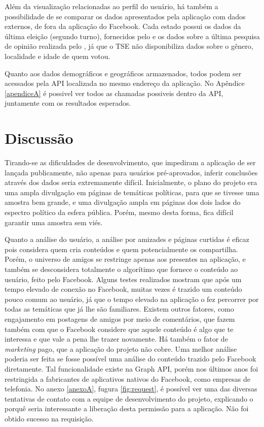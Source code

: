 \documentclass[
	12pt,				%
	oneside,			%
	a4paper,			%
	english,			%
	brazil				%
	]{abntex2ppgsi}
\begin{document}
Além da visualização relacionadas ao perfil do usuário, há também a possibilidade de se comparar os dados apresentados pela aplicação com dados externos, de fora da aplicação do Facebook. Cada estado possui os dados da última eleição (segundo turno), fornecidos pelo  e os dados sobre a última pesquisa de opinião realizada pelo , já que o TSE não disponibiliza dados sobre o gênero, localidade e idade de quem votou. 

Quanto aos dados demográficos e geográficos armazenados, todos podem ser acessados pela API localizada no mesmo endereço da aplicação. No Apêndice \ref{apendiceA} é possivel ver todos as chamadas possiveis dentro da API, juntamente com os resultados esperados. 

\chapter{Discussão}

Tirando-se as dificuldades de desenvolvimento, que impediram a aplicação de ser lançada publicamente, não apenas para usuários pré-aprovados, inferir conclusões através dos dados seria extremamente difícil. Inicialmente, o plano do projeto era uma ampla divulgação em páginas de temáticas políticas, para que se tivesse uma amostra bem grande, e uma divulgação ampla em páginas dos dois lados do espectro político da esfera pública. Porém, mesmo desta forma, fica difícil garantir uma amostra sem viés. 

Quanto a análise do usuário, a análise por amizades e páginas curtidas é eficaz pois considera quem cria conteúdos e quem potencialmente os compartilha. Porém, o universo de amigos se restringe apenas aos presentes na aplicação, e também se desconsidera totalmente o algorítimo que fornece o conteúdo ao usuário, feito pelo Facebook. Alguns testes realizados mostram que após um tempo elevado de conexão no Facebook, muitas vezes é trazido um conteúdo pouco comum ao usuário, já que o tempo elevado na aplicação o fez percorrer por todas as temáticas que já lhe são familiares. Existem outros fatores, como engajamento em postagens de amigos por meio de comentários, que fazem também com que o Facebook considere que aquele conteúdo é algo que te interessa e que vale a pena lhe trazer novamente. Há também o fator de \textit{marketing} pago, que a aplicação do projeto não cobre. Uma melhor análise poderia ser feita se fosse possível uma análise do conteúdo trazido pelo Facebook diretamente. Tal funcionalidade existe na Graph API, porém nos últimos anos foi restringida a fabricantes de aplicativos nativos do Facebook, como empresas de telefonia. No anexo \ref{anexoA}, fugura \ref{fig:request}, é possível ver uma das diversas tentativas de contato com a equipe de desenvolvimento do projeto, explicando o porquê seria interessante a liberação desta permissão para a aplicação. Não foi obtido sucesso na requisição.
\end{document}
